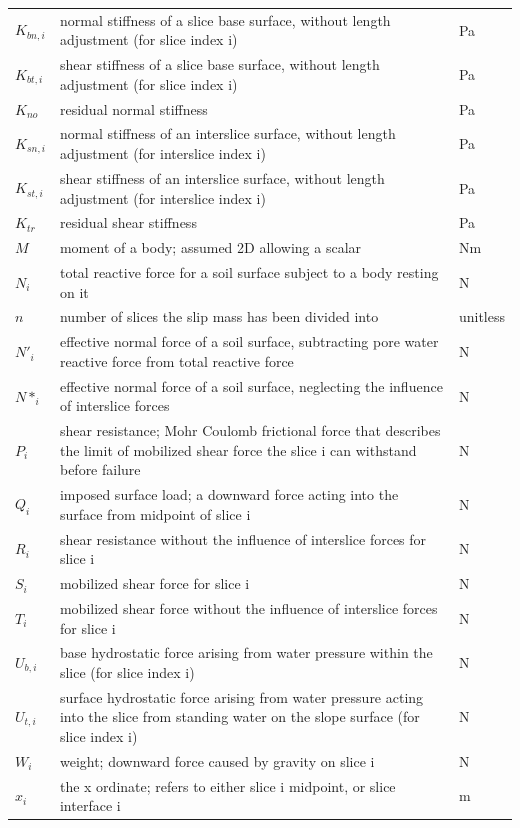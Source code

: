 \documentclass[12pt]{article}
\begin{document}
\begin{longtable*}{l l l}
$K_{bn,i}$ & normal stiffness of a slice base surface, without length adjustment (for slice index i) & Pa
\\
$K_{bt,i}$ & shear stiffness of a slice base surface, without length adjustment (for slice index i) & Pa
\\
$K_{no}$ & residual normal stiffness & Pa
\\
$K_{sn,i}$ & normal stiffness of an interslice surface, without length adjustment (for interslice index i) & Pa
\\
$K_{st,i}$ & shear stiffness of an interslice surface, without length adjustment (for interslice index i) & Pa
\\
$K_{tr}$ & residual shear stiffness & Pa
\\
$M$ & moment of a body; assumed 2D allowing a scalar & Nm
\\
$N_{i}$ & total reactive force for a soil surface subject to a body resting on it & N
\\
$n$ & number of slices the slip mass has been divided into & unitless
\\
$N'_{i}$ & effective normal force of a soil surface, subtracting pore water reactive force from total reactive force & N
\\
$N*_{i}$ & effective normal force of a soil surface, neglecting the influence of interslice forces & N
\\
$P_{i}$ & shear resistance; Mohr Coulomb frictional force that describes the limit of mobilized shear force the slice i can withstand before failure & N
\\
$Q_{i}$ & imposed surface load; a downward force acting into the surface from midpoint of slice i & N
\\
$R_{i}$ & shear resistance without the influence of interslice forces for slice i & N
\\
$S_{i}$ & mobilized shear force for slice i & N
\\
$T_{i}$ & mobilized shear force without the influence of interslice forces for slice i & N
\\
$U_{b,i}$ & base hydrostatic force arising from water pressure within the slice (for slice index i) & N
\\
$U_{t,i}$ & surface hydrostatic force arising from water pressure acting into the slice from standing water on the slope surface (for slice index i) & N
\\
$W_{i}$ & weight; downward force caused by gravity on slice i & N
\\
$x_{i}$ & the x ordinate; refers to either slice i midpoint, or slice interface i & m

\end{longtable*}
\end{document}
